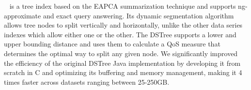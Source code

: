 ~\cite{conf/vldb/Wang2013} is a tree index based on the EAPCA summarization technique and supports ng-approximate and exact query answering. 
Its dynamic segmentation algorithm %
allows tree nodes to split vertically and horizontally, unlike the other data series indexes which allow either one or the other. 
The DSTree supports a lower and upper bounding distance and uses them to calculate a QoS measure that determines the optimal way to split any given node. 
We significantly improved the efficiency of the original DSTree Java implementation by developing it from scratch in C and optimizing its buffering and memory management, 
making it 4 times faster across datasets ranging between 25-250GB.


